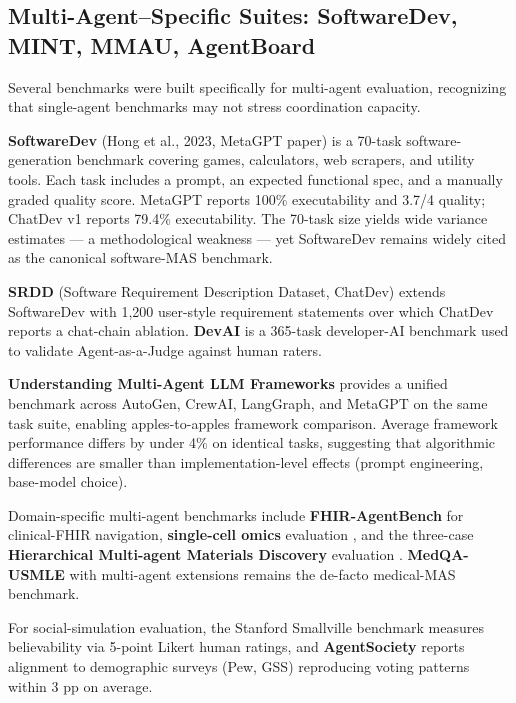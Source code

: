 \documentclass{article}
\begin{document}
\subsection{Multi-Agent--Specific Suites: SoftwareDev, MINT, MMAU, AgentBoard}\label{multi-agentspecific-suites-softwaredev-mint-mmau-agentboard}

Several benchmarks were built specifically for multi-agent evaluation, recognizing that single-agent benchmarks may not stress coordination capacity.

\textbf{SoftwareDev} (Hong et al., 2023, MetaGPT paper) is a 70-task software-generation benchmark covering games, calculators, web scrapers, and utility tools. Each task includes a prompt, an expected functional spec, and a manually graded quality score. MetaGPT reports 100\% executability and 3.7/4 quality; ChatDev v1 reports 79.4\% executability. The 70-task size yields wide variance estimates --- a methodological weakness --- yet SoftwareDev remains widely cited as the canonical software-MAS benchmark.

\textbf{SRDD} (Software Requirement Description Dataset, ChatDev) extends SoftwareDev with 1,200 user-style requirement statements over which ChatDev reports a chat-chain ablation. \textbf{DevAI} \citep{zhuge20242024} is a 365-task developer-AI benchmark used to validate Agent-as-a-Judge against human raters.

\textbf{Understanding Multi-Agent LLM Frameworks} \citep{orogat2026understandingmulti} provides a unified benchmark across AutoGen, CrewAI, LangGraph, and MetaGPT on the same task suite, enabling apples-to-apples framework comparison. Average framework performance differs by under 4\% on identical tasks, suggesting that algorithmic differences are smaller than implementation-level effects (prompt engineering, base-model choice).

Domain-specific multi-agent benchmarks include \textbf{FHIR-AgentBench} \citep{lee20252025} for clinical-FHIR navigation, \textbf{single-cell omics} evaluation \citep{liu20262026}, and the three-case \textbf{Hierarchical Multi-agent Materials Discovery} evaluation \citep{rothfarb20252025}. \textbf{MedQA-USMLE} with multi-agent extensions remains the de-facto medical-MAS benchmark.

For social-simulation evaluation, the Stanford Smallville benchmark \citep{park2023generativeagentsin} measures believability via 5-point Likert human ratings, and \textbf{AgentSociety} \citep{piao20252025} reports alignment to demographic surveys (Pew, GSS) reproducing voting patterns within 3 pp on average.
\end{document}
